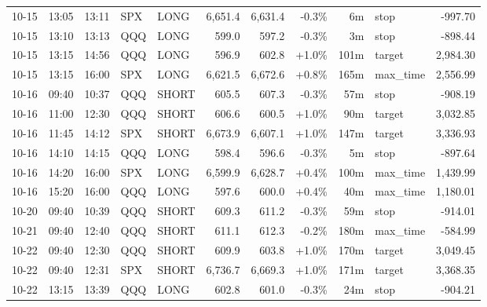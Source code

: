 \documentclass[11pt,a4paper,twoside]{article}
\begin{document}
\begin{center}
\begin{longtable}{>{\color{txtmain}}l l l l l r r r r >{\color{txtmain}}l r}
10-15 & 13:05 & 13:11 & SPX & LONG & 6,651.4 & 6,631.4 & \textcolor{lossred}{-0.3\%} & 6m & stop & \textcolor{lossred}{-997.70} \\
10-15 & 13:10 & 13:13 & QQQ & LONG & 599.0 & 597.2 & \textcolor{lossred}{-0.3\%} & 3m & stop & \textcolor{lossred}{-898.44} \\
10-15 & 13:15 & 14:56 & QQQ & LONG & 596.9 & 602.8 & \textcolor{wingreen}{+1.0\%} & 101m & target & \textcolor{wingreen}{2,984.30} \\
10-15 & 13:15 & 16:00 & SPX & LONG & 6,621.5 & 6,672.6 & \textcolor{wingreen}{+0.8\%} & 165m & max\_time & \textcolor{wingreen}{2,556.99} \\
10-16 & 09:40 & 10:37 & QQQ & SHORT & 605.5 & 607.3 & \textcolor{lossred}{-0.3\%} & 57m & stop & \textcolor{lossred}{-908.19} \\
10-16 & 11:00 & 12:30 & QQQ & SHORT & 606.6 & 600.5 & \textcolor{wingreen}{+1.0\%} & 90m & target & \textcolor{wingreen}{3,032.85} \\
10-16 & 11:45 & 14:12 & SPX & SHORT & 6,673.9 & 6,607.1 & \textcolor{wingreen}{+1.0\%} & 147m & target & \textcolor{wingreen}{3,336.93} \\
10-16 & 14:10 & 14:15 & QQQ & LONG & 598.4 & 596.6 & \textcolor{lossred}{-0.3\%} & 5m & stop & \textcolor{lossred}{-897.64} \\
10-16 & 14:20 & 16:00 & SPX & LONG & 6,599.9 & 6,628.7 & \textcolor{wingreen}{+0.4\%} & 100m & max\_time & \textcolor{wingreen}{1,439.99} \\
10-16 & 15:20 & 16:00 & QQQ & LONG & 597.6 & 600.0 & \textcolor{wingreen}{+0.4\%} & 40m & max\_time & \textcolor{wingreen}{1,180.01} \\
10-20 & 09:40 & 10:39 & QQQ & SHORT & 609.3 & 611.2 & \textcolor{lossred}{-0.3\%} & 59m & stop & \textcolor{lossred}{-914.01} \\
10-21 & 09:40 & 12:40 & QQQ & SHORT & 611.1 & 612.3 & \textcolor{lossred}{-0.2\%} & 180m & max\_time & \textcolor{lossred}{-584.99} \\
10-22 & 09:40 & 12:30 & QQQ & SHORT & 609.9 & 603.8 & \textcolor{wingreen}{+1.0\%} & 170m & target & \textcolor{wingreen}{3,049.45} \\
10-22 & 09:40 & 12:31 & SPX & SHORT & 6,736.7 & 6,669.3 & \textcolor{wingreen}{+1.0\%} & 171m & target & \textcolor{wingreen}{3,368.35} \\
10-22 & 13:15 & 13:39 & QQQ & LONG & 602.8 & 601.0 & \textcolor{lossred}{-0.3\%} & 24m & stop & \textcolor{lossred}{-904.21} \\

\end{longtable}
\end{center}
\end{document}
